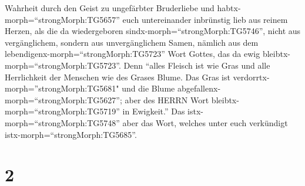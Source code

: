 Wahrheit durch den Geist zu ungefärbter Bruderliebe und
habtx-morph=``strongMorph:TG5657'' euch untereinander inbrünstig lieb
aus reinem Herzen,  als die da wiedergeboren
sindx-morph=``strongMorph:TG5746'', nicht aus vergänglichem, sondern aus
unvergänglichem Samen, nämlich aus dem
lebendigenx-morph=``strongMorph:TG5723'' Wort Gottes, das da ewig
bleibtx-morph=``strongMorph:TG5723''.  Denn ``alles Fleisch
ist wie Gras und alle Herrlichkeit der Menschen wie des Grases Blume.
Das Gras ist verdorrtx-morph=''strongMorph:TG5681" und die Blume
abgefallenx-morph=``strongMorph:TG5627'';  aber des HERRN
Wort bleibtx-morph=``strongMorph:TG5719'' in Ewigkeit.'' Das
istx-morph=``strongMorph:TG5748'' aber das Wort, welches unter euch
verkündigt istx-morph=``strongMorph:TG5685''.

\hypertarget{section-1}{%
\section{2}\label{section-1}}

